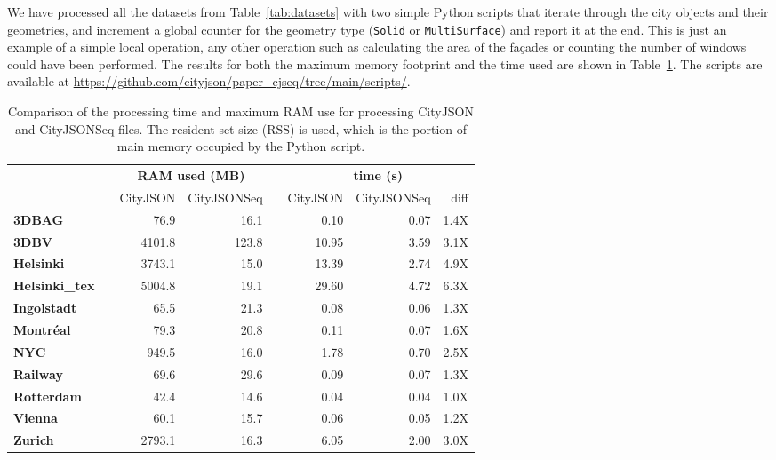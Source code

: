\documentclass{isprs} %
\begin{document}
We have processed all the datasets from Table~\ref{tab:datasets} with two simple Python scripts that iterate through the city objects and their geometries, and increment a global counter for the geometry type (\texttt{Solid} or \texttt{MultiSurface}) and report it at the end.
This is just an example of a simple local operation, any other operation such as calculating the area of the façades or counting the number of windows could have been performed.
The results for both the maximum memory footprint and the time used are shown in Table~\ref{tab:ramtime}.
The scripts are available at \url{https://github.com/cityjson/paper_cjseq/tree/main/scripts/}.
\begin{table}
  \centering
  \caption{Comparison of the processing time and maximum RAM use for processing CityJSON and CityJSONSeq files. The resident set size (RSS) is used, which is the portion of main memory occupied by the Python script.}
  \small
  \begin{tabular}
    {@{}lcrrcrrr@{}}\toprule
    &&  \multicolumn{2}{c}{\textbf{RAM used (MB)}} && \multicolumn{3}{c}{\textbf{time (s)}} \\ 
    \cmidrule{3-4} \cmidrule{6-8} 
     && CityJSON & CityJSONSeq && CityJSON & CityJSONSeq & diff \\
    \midrule
     \textbf{3DBAG}         &&   76.9 &  16.1  &&   0.10 & 0.07 & 1.4X \\
     \textbf{3DBV}          && 4101.8 & 123.8  &&  10.95 & 3.59 & 3.1X \\
     \textbf{Helsinki}      && 3743.1 &  15.0  &&  13.39 & 2.74 & 4.9X \\
     \textbf{Helsinki\_tex} && 5004.8 &  19.1  &&  29.60 & 4.72 & 6.3X \\
     \textbf{Ingolstadt}    &&   65.5 &  21.3  &&   0.08 & 0.06 & 1.3X \\
     \textbf{Montréal}      &&   79.3 &  20.8  &&   0.11 & 0.07 & 1.6X \\
     \textbf{NYC}           &&  949.5 &  16.0  &&   1.78 & 0.70 & 2.5X \\
     \textbf{Railway}       &&   69.6 &  29.6  &&   0.09 & 0.07 & 1.3X \\
     \textbf{Rotterdam}     &&   42.4 &  14.6  &&   0.04 & 0.04 & 1.0X \\
     \textbf{Vienna}        &&   60.1 &  15.7  &&   0.06 & 0.05 & 1.2X \\
     \textbf{Zurich}        && 2793.1 &  16.3  &&   6.05 & 2.00 & 3.0X \\
    \bottomrule
  \end{tabular}%
  \label{tab:ramtime}
\end{table}
\end{document}
